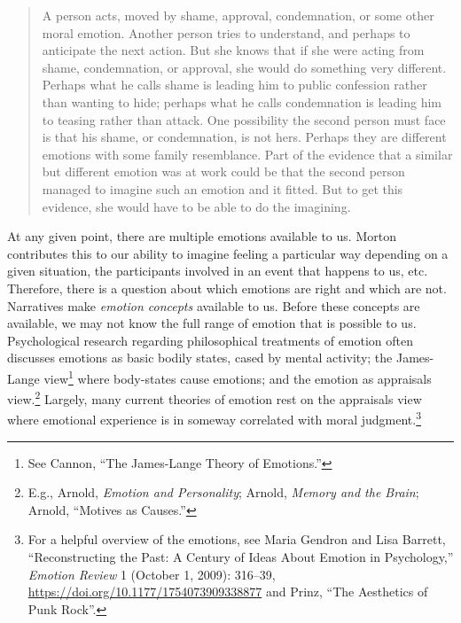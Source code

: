 \documentclass[phdthesis,12pt,final]{wuthesis}
\theoremstyle{definition}
\theoremstyle{definition}
\theoremstyle{definition}
\theoremstyle{definition}
\theoremstyle{remark}
\begin{document}
\begin{quote}
A person acts, moved by shame, approval, condemnation, or some other moral emotion. Another person tries to understand, and perhaps to anticipate the next action. But she knows that if she were acting from shame, condemnation, or approval, she would do something very different. Perhaps what he calls shame is leading him to public confession rather than wanting to hide; perhaps what he calls condemnation is leading him to teasing rather than attack. One possibility the second person must face is that his shame, or condemnation, is not hers. Perhaps they are different emotions with some family resemblance. Part of the evidence that a similar but different emotion was at work could be that the second person managed to imagine such an emotion and it fitted. But to get this evidence, she would have to be able to do the imagining.
\end{quote}

At any given point, there are multiple emotions available to us. Morton contributes this to our ability to imagine feeling a particular way depending on a given situation, the participants involved in an event that happens to us, etc. Therefore, there is a question about which emotions are right and which are not. Narratives make \emph{emotion concepts} available to us. Before these concepts are available, we may not know the full range of emotion that is possible to us. Psychological research regarding philosophical treatments of emotion often discusses emotions as basic bodily states, cased by mental activity; the James-Lange view\footnote{See Cannon, {``The {James-Lange} Theory of Emotions.''}} where body-states cause emotions; and the emotion as appraisals view.\footnote{E.g., Arnold, \emph{Emotion and {Personality}}; Arnold, \emph{Memory and the Brain}; Arnold, {``Motives as Causes.''}} Largely, many current theories of emotion rest on the appraisals view where emotional experience is in someway correlated with moral judgment.\footnote{For a helpful overview of the emotions, see Maria Gendron and Lisa Barrett, {``Reconstructing the {Past}: {A Century} of {Ideas About Emotion} in {Psychology},''} \emph{Emotion Review} 1 (October 1, 2009): 316--39, \url{https://doi.org/10.1177/1754073909338877} and Prinz, {``The {Aesthetics} of {Punk Rock}''}.}
\end{document}
